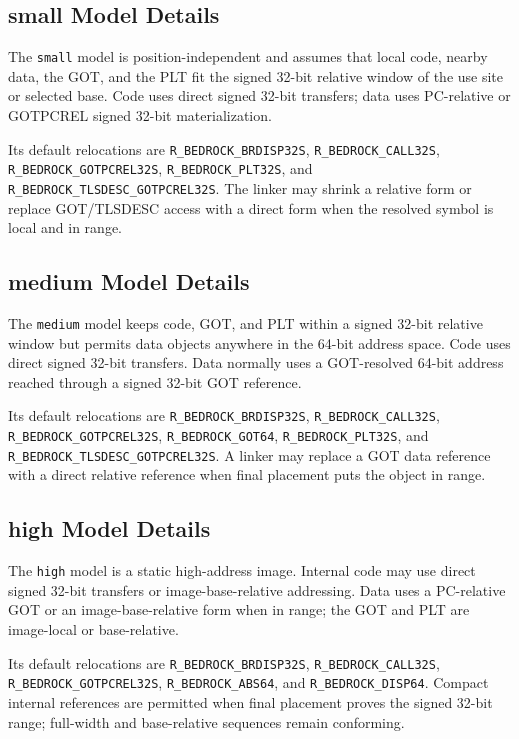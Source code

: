 \documentclass[10pt,twoside]{article}
\begin{document}
\subsection{small Model Details}
The \texttt{small} model is position-independent and assumes that local code,
nearby data, the GOT, and the PLT fit the signed 32-bit relative window of the
use site or selected base. Code uses direct signed 32-bit transfers; data uses
PC-relative or GOTPCREL signed 32-bit materialization.

Its default relocations are \texttt{R\_BEDROCK\_BRDISP32S},
\texttt{R\_BEDROCK\_CALL32S}, \texttt{R\_BEDROCK\_GOTPCREL32S},
\texttt{R\_BEDROCK\_PLT32S}, and
\texttt{R\_BEDROCK\_TLSDESC\_GOTPCREL32S}. The linker may shrink a relative
form or replace GOT/TLSDESC access with a direct form when the resolved symbol
is local and in range.
\subsection{medium Model Details}
The \texttt{medium} model keeps code, GOT, and PLT within a signed 32-bit
relative window but permits data objects anywhere in the 64-bit address space.
Code uses direct signed 32-bit transfers. Data normally uses a GOT-resolved
64-bit address reached through a signed 32-bit GOT reference.

Its default relocations are \texttt{R\_BEDROCK\_BRDISP32S},
\texttt{R\_BEDROCK\_CALL32S}, \texttt{R\_BEDROCK\_GOTPCREL32S},
\texttt{R\_BEDROCK\_GOT64}, \texttt{R\_BEDROCK\_PLT32S}, and
\texttt{R\_BEDROCK\_TLSDESC\_GOTPCREL32S}. A linker may replace a GOT data
reference with a direct relative reference when final placement puts the
object in range.

\subsection{high Model Details}
The \texttt{high} model is a static high-address image. Internal code may use
direct signed 32-bit transfers or image-base-relative addressing. Data uses a
PC-relative GOT or an image-base-relative form when in range; the GOT and PLT
are image-local or base-relative.

Its default relocations are \texttt{R\_BEDROCK\_BRDISP32S},
\texttt{R\_BEDROCK\_CALL32S}, \texttt{R\_BEDROCK\_GOTPCREL32S},
\texttt{R\_BEDROCK\_ABS64}, and \texttt{R\_BEDROCK\_DISP64}. Compact internal
references are permitted when final placement proves the signed 32-bit range;
full-width and base-relative sequences remain conforming.
\end{document}
